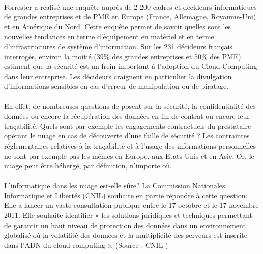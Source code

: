 \documentclass[a4paper,12pt]{report}
\begin{document}
\begin{onehalfspace}
	\paragraph*{}
	Forrester a réalisé une enquête \cite{source:forrester} auprès de 2 200 cadres et décideurs informatiques de grandes entreprises et de PME en Europe (France, Allemagne, Royaume-Uni) et en Amérique du Nord. Cette enquête permet de savoir quelles sont les nouvelles tendances en terme d’équipement en matériel et en terme d’infrastructures de système d’information. Sur les 231 décideurs français interrogés, environ la moitié (39\% des grandes entreprises et 50\% des PME) estiment que la sécurité est un frein important à l’adoption du Cloud Computing dans leur entreprise. Les décideurs craignent en particulier la divulgation d’informations sensibles en cas d’erreur de manipulation ou de piratage.

	\paragraph*{}
	En effet, de nombreuses questions de posent sur la sécurité, la confidentialité des données ou encore la récupération des données en fin de contrat ou encore leur traçabilité. Quels sont par exemple les engagements contractuels du prestataire opérant le nuage en cas de découverte d'une faille de sécurité ? Les contraintes réglementaires relatives à la traçabilité et à l'usage des informations personnelles ne sont par exemple pas les mêmes en Europe, aux Etats-Unis et en Asie. Or, le nuage peut être hébergé, par définition, n'importe où.

	\paragraph*{}
	L’informatique dans les nuage est-elle sûre? La Commission Nationales Informatique et Libertés (CNIL) souhaite en partie répondre à cette question. Elle a lancer un vaste consultation publique entre le 17 octobre et le 17 novembre 2011. Elle souhaite identifier « les solutions juridiques et techniques permettant de garantir un haut niveau de protection des données dans un environnement globalisé où la volatilité des données et la multiplicité des serveurs est inscrite dans l'ADN du cloud computing ». (Source : CNIL \cite{source:cnil})


\end{onehalfspace}
\end{document}

